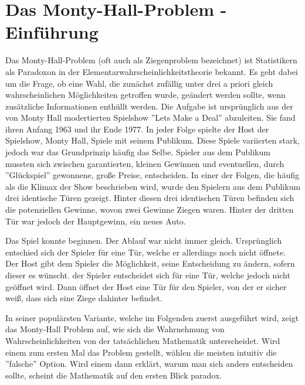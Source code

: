
\chapter{Das Monty-Hall-Problem - Einführung}

Das Monty-Hall-Problem (oft auch als Ziegenproblem bezeichnet) ist Statistikern als Paradoxon in der Elementarwahrscheinlichkeitstheorie bekannt. Es geht dabei um die Frage, ob eine Wahl, die zunächst
zufällig unter drei a priori gleich wahrscheinlichen Möglichkeiten getroffen wurde, geändert werden sollte, wenn zusätzliche
Informationen enthüllt werden. Die Aufgabe ist ursprünglich aus der von Monty Hall modertierten Spielshow ''Lets Make a Deal'' abzuleiten. Sie fand ihren Anfang
1963 und ihr Ende 1977. In jeder Folge spielte der Host der Spielshow, Monty Hall, Spiele mit seinem Publikum. Diese Spiele variierten stark, jedoch war das Grundprinzip
häufig das Selbe. Spieler aus dem Publikum mussten sich zwischen garantierten, kleinen Gewinnen und eventuellen, durch ''Glückspiel'' gewonnene, große Preise, entscheiden.
In einer der Folgen, die häufig als die Klimax der Show beschrieben wird, wurde den Spielern aus dem Publikum drei identische Türen gezeigt. Hinter diesen drei
identischen Türen befinden sich die potenziellen Gewinne, wovon zwei Gewinne Ziegen waren. Hinter der dritten Tür war jedoch der Hauptgewinn, ein neues Auto.

Das Spiel konnte beginnen. Der Ablauf war nicht immer gleich. Ursprünglich entschied sich der Spieler für eine Tür, welche er allerdings noch nicht öffnete.
Der Host gibt dem Spieler die Möglichkeit, seine Entscheidung zu ändern, sofern dieser es wünscht. der Spieler entscheidet sich für eine Tür, welche jedoch nicht geöffnet wird. Dann öffnet der Host eine Tür für
den Spieler, von der er sicher weiß, dass sich eine Ziege dahinter befindet.

In seiner populärsten Variante, welche im Folgenden zuerst ausgeführt wird, zeigt das Monty-Hall Problem auf, wie sich die Wahrnehmung von Wahrscheinlichkeiten von der tatsächlichen Mathematik unterscheidet.
Wird einem zum ersten Mal das Problem gestellt, wählen die meisten intuitiv die ''falsche'' Option. Wird einem dann erklärt, warum man sich anders entscheiden sollte, scheint die Mathematik auf den ersten Blick paradox.
